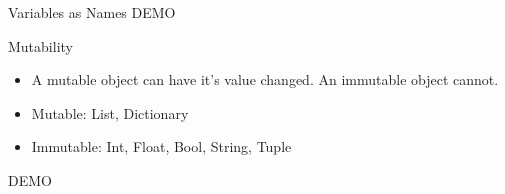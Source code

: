 \documentclass[serif,xcolor=pdftex,dvipsnames,table,hyperref={bookmarks=false,breaklinks}]{beamer}
\begin{document}
\begin{frame}[t]{Variables as Names}
	\centering
	\Huge{DEMO}
\end{frame}

\begin{frame}[t]{Mutability}
	\begin{itemize}[<+->]
		\item A mutable object can have it's value changed. An immutable object cannot.
		\item Mutable: List, Dictionary
		\item Immutable: Int, Float, Bool, String, Tuple
	\end{itemize}

	\pause
	\centering
	\Huge{DEMO}
\end{frame}

\end{document}
